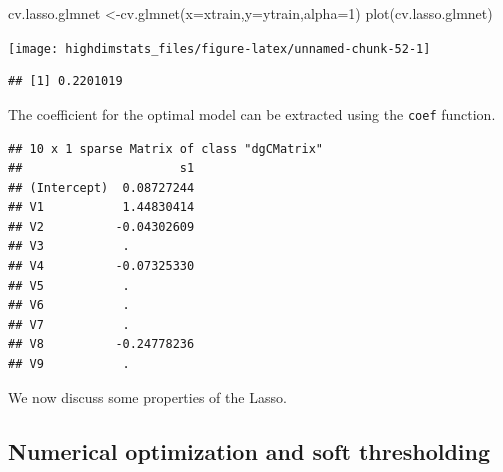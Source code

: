 \documentclass[
]{book}
\newenvironment{Shaded}{\begin{snugshade}}{\end{snugshade}}
\newcommand{\AttributeTok}[1]{\textcolor[rgb]{0.77,0.63,0.00}{#1}}
\newcommand{\DecValTok}[1]{\textcolor[rgb]{0.00,0.00,0.81}{#1}}
\newcommand{\FunctionTok}[1]{\textcolor[rgb]{0.00,0.00,0.00}{#1}}
\newcommand{\NormalTok}[1]{#1}
\newcommand{\OtherTok}[1]{\textcolor[rgb]{0.56,0.35,0.01}{#1}}
\newcommand{\SpecialCharTok}[1]{\textcolor[rgb]{0.00,0.00,0.00}{#1}}
\begin{document}
\begin{Shaded}
\begin{Highlighting}[]
\NormalTok{cv.lasso.glmnet }\OtherTok{\textless{}{-}}\FunctionTok{cv.glmnet}\NormalTok{(}\AttributeTok{x=}\NormalTok{xtrain,}\AttributeTok{y=}\NormalTok{ytrain,}\AttributeTok{alpha=}\DecValTok{1}\NormalTok{) }
\FunctionTok{plot}\NormalTok{(cv.lasso.glmnet)}
\end{Highlighting}
\end{Shaded}

\begin{center}\texttt{[image: highdimstats\_files/figure-latex/unnamed-chunk-52-1]} \end{center}

\begin{Shaded}
\end{Shaded}

\begin{verbatim}
## [1] 0.2201019
\end{verbatim}

The coefficient for the optimal model can be extracted using the \texttt{coef} function.

\begin{Shaded}
\end{Shaded}

\begin{verbatim}
## 10 x 1 sparse Matrix of class "dgCMatrix"
##                      s1
## (Intercept)  0.08727244
## V1           1.44830414
## V2          -0.04302609
## V3           .         
## V4          -0.07325330
## V5           .         
## V6           .         
## V7           .         
## V8          -0.24778236
## V9           .
\end{verbatim}

We now discuss some properties of the Lasso.

\hypertarget{numerical-optimization-and-soft-thresholding}{%
\subsection{Numerical optimization and soft thresholding}\label{numerical-optimization-and-soft-thresholding}}
\end{document}
